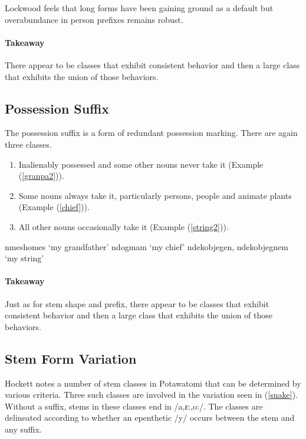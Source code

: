 Lockwood feels that long forms have been gaining ground as a default
but overabundance in person prefixes remains robust.

\paragraph{Takeaway} There appear to be classes that exhibit
consistent behavior and then a large class that exhibits the union of
those behaviors.

\subsection{Possession Suffix}

The possession suffix is a form of redundant possession marking. There
are again three classes.

\begin{enumerate}
\item Inalienably possessed and some other nouns never take it
  (Example (\ref{granpa2})).
\item Some nouns always take it, particularly persons, people and
  animate plants (Example (\ref{chief})).
\item All other nouns occasionally take it (Example (\ref{string2})).
\end{enumerate}

\pex
\a\label{granpa2} nmeshomes `my grandfather'
\a\label{chief} ndogmam `my chief'
\a\label{string2} ndekobjegen, ndekobjegnem `my string'
\xe

\paragraph{Takeaway} Just as for stem shape and prefix, there appear
to be classes that exhibit consistent behavior and then a large class
that exhibits the union of those behaviors.

\subsection{Stem Form Variation}

Hockett notes a number of stem classes in Potawatomi that can be
determined by various criteria. Three such classes are involved in the
variation seen in (\ref{snake}). Without a suffix, stems in these
classes end in /a,ɛ:,o:/. The classes are delineated according to
whether an epenthetic /y/ occurs between the stem and any suffix.

